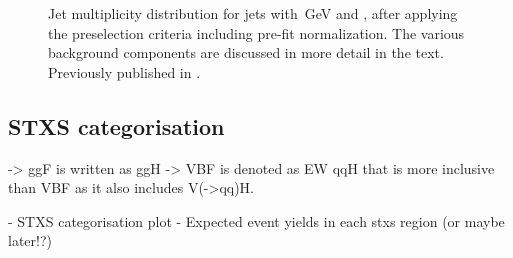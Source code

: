 \begin{figure}
    \caption{Jet multiplicity distribution for jets with \,GeV and , after applying the preselection criteria including pre-fit normalization. The various background components are discussed in more detail in the text. Previously published in .}
    \label{fig:njet-dist}
\end{figure}


\subsection{STXS categorisation}
\label{subsec:STXS-categorization}

-> ggF is written as ggH
-> VBF is denoted as EW qqH that is more inclusive than VBF as it also includes V(->qq)H.

- STXS categorisation plot
- Expected event yields in each stxs region (or maybe later!?)




